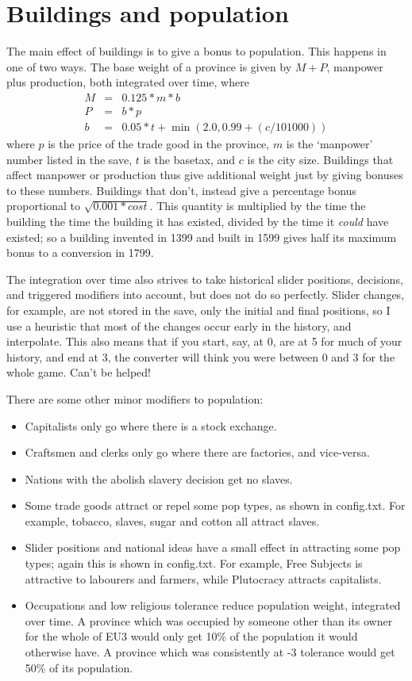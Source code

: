 \documentclass[12pt]{article}
\begin{document}
\section{Buildings and population}

The main effect of buildings is to give a bonus to population. This
happens in one of two ways. The base weight of a province is given by
$M+P$, manpower plus production, both integrated over time, where
\begin{eqnarray*}
M &=& 0.125*m*b \\
P &=& b*p \\
b &=& 0.05*t + \min(2.0, 0.99+(c/101000))
\end{eqnarray*}
where $p$ is the price of the trade good in the province, $m$ is
the `manpower' number listed in the save, $t$ is the basetax, and $c$
is the city size. Buildings that affect manpower or production thus
give additional weight just by giving bonuses to these
numbers. Buildings that don't, instead give a percentage bonus
proportional to $\sqrt{0.001*cost}$. This quantity is multiplied by
the time the building the time the building it has existed, divided by
the time it \emph{could} have existed; so a building invented in 1399
and built in 1599 gives half its maximum bonus to a conversion in
1799. 

The integration over time also strives to take historical slider
positions, decisions, and triggered modifiers into account, but does
not do so perfectly. Slider changes, for example, are not stored in
the save, only the initial and final positions, so I use a heuristic
that most of the changes occur early in the history, and
interpolate. This also means that if you start, say, at 0, are at 5
for much of your history, and end at 3, the converter will think you
were between 0 and 3 for the whole game. Can't be helped! 

There are some other minor modifiers to population:
\begin{itemize}
\item Capitalists only go where there is a stock exchange. 
\item Craftsmen and clerks only go where there are factories, and
  vice-versa. 
\item Nations with the abolish slavery decision get no slaves. 
\item Some trade goods attract or repel some pop types, as shown in
  config.txt. For example, tobacco, slaves, sugar and cotton all
  attract slaves. 
\item Slider positions and national ideas have a small effect in
  attracting some pop types; again this is shown in config.txt. For
  example, Free Subjects is attractive to labourers and farmers, while
  Plutocracy attracts capitalists. 
\item Occupations and low religious tolerance reduce population
  weight, integrated over time. A province which was occupied by
  someone other than its owner for the whole of EU3 would only get
  10\% of the population it would otherwise have. A province which was
  consistently at -3 tolerance would get 50\% of its population. 
\end{itemize}
\end{document}

